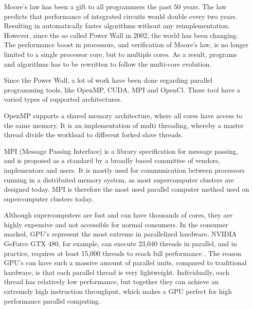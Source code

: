 Moore's law has been a gift to all programmers the past 50 years. The law predicts that performance of integrated circuits would double every two years. Resulting in automatically faster algorithms without any reimplementation. However, since the so called Power Wall in 2002, the world has been changing. The performance boost  in processors, and verification of Moore's law, is no longer limited to a single processor core, but to multiple cores. As a result, programs and algorithms has to be rewritten to follow the multi-core evolution.

Since the Power Wall, a lot of work have been done regarding parallel programming tools, like OpenMP, CUDA, MPI and OpenCl. These tool have a varied types of supported architectures.

OpenMP supports a shared memory architecture, where all cores have access to the same memory. It is an implementation of multi threading, whereby a master thread divide the workload to different forked slave threads.

MPI (Message Passing Interface) is a library specification for message passing, and is proposed as a standard by a broadly based committee of vendors, implementors and users. It is mostly used for communication between processors running in a distributed memory system, as most supercomputer clusters are designed today. MPI is therefore the most used parallel computer method used on supercomputer clusters today.

Although supercomputers are fast and can have thousands of cores, they are highly expensive and not accessible for normal consumers. In the consumer marked, GPU's represent the most extreme in parallelized hardware. NVIDIA GeForce GTX 480, for example, can execute 23,040 threads in parallel, and in practice, requires at least 15,000 threads to reach full performance \citep{karras2012}. The reason GPU's can have such a massive amount of parallel units, compared to traditional hardware, is that each parallel thread is very lightweight. Individually, each thread has relatively low performance, but together they can achieve an extremely high instruction throughput, which  makes a GPU perfect for high performance parallel computing.

